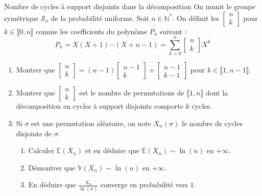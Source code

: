 \documentclass[french,a4paper]{article}
\newcommand{\N}{\mathbb{N}}
\newcommand{\st}{^*}
\newcommand{\E}{\mathbb{E}}
\newcommand{\V}{\mathbb{V}}
\theoremstyle{plain}
\theoremstyle{definition}
\theoremstyle{remark}
\begin{document}
\begin{ex}[Châteaux]{Nombre de cycles à support disjoints dans la décomposition}
	On munit le groupe symétrique $\mathcal{S}_n$ de la probabilité uniforme. Soit $n\in\N\st$. On définit les $\displaystyle\begin{bmatrix}
		n\\ k
	\end{bmatrix}$ pour $k\in\llbracket0,n\rrbracket$ comme les coefficients du polynôme $P_n$ suivant : $$P_n=X(X+1)\cdots(X+n-1)=\sum_{k=0}^{n}\begin{bmatrix}
		n\\ k
	\end{bmatrix}X^k$$
	\begin{enumerate}
		\item Montrer que $\displaystyle\begin{bmatrix}
			n\\ k
		\end{bmatrix}=(n-1)\begin{bmatrix}
			n-1\\ k
		\end{bmatrix}+\begin{bmatrix}
			n-1 \\ k-1
		\end{bmatrix}$ pour $k\in\llbracket1,n-1\rrbracket$.
		\item Montrer que $\displaystyle\begin{bmatrix}
			n\\ k
		\end{bmatrix}$ est le nombre de permutations de $\llbracket1,n\rrbracket$ dont la décomposition en cycles à support disjoints comporte $k$ cycles.
		\item Si $\sigma$ est une permutation aléatoire, on note $X_n(\sigma)$ le nombre de cycles disjoints de $\sigma$.
		\begin{enumerate}[label=\alph*.]
			\item Calculer $\E(X_n)$ et en déduire que $\E(X_n)\sim\ln(n)$ en $+\infty$.
			\item Démontrer que $\V(X_n)\sim\ln(n)$ en $+\infty$.
			\item En déduire que $\displaystyle\frac{X_n}{\ln(n)}$ converge en probabilité vers $1$.
		\end{enumerate}
	\end{enumerate}
\end{ex}
\end{document}

